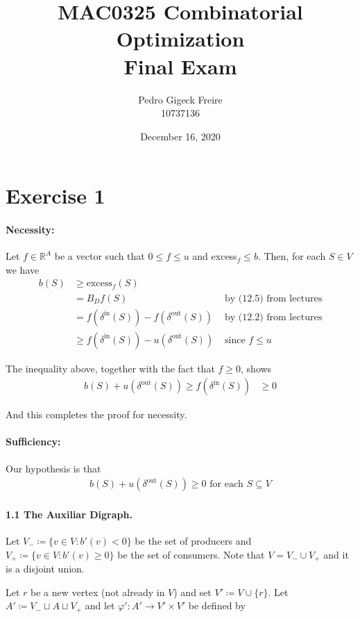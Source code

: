 \documentclass[a4paper,10pt, leqno]{article}
\title{MAC0325 Combinatorial Optimization \\
        \large Final Exam}
\author{Pedro Gigeck Freire \\
        10737136}
\date{December 16, 2020}
\theoremstyle{definition}
\begin{document}
\maketitle

\section*{Exercise 1}


\paragraph{Necessity:}

Let $f \in \mathbb{R}^A$ be a vector such that $0 \leq f \leq u$ and excess$_f \leq b$.
Then, for each $S \in V$ we have
\begin{align*}
 b(S) &\geq \text{excess}_f(S) \\
 &= B_Df(S) &\text{ by (12.5) from lectures} \\
 &= f(\delta^{\text{in}}(S)) - f(\delta^{\text{out}}(S)) &\text{ by (12.2) from lectures}\\
 &\geq f(\delta^{\text{in}}(S)) - u(\delta^{\text{out}}(S)) &\text{ since } f \leq u
\end{align*}

The inequality above, together with the fact that $f \geq 0$, shows
\begin{align*}
 b(S) + u(\delta^{\text{out}}(S)) \geq f(\delta^{\text{in}}(S)) &\geq 0
\end{align*}

And this completes the proof for necessity.

\paragraph{Sufficiency:} Our hypothesis is that 
\begin{align*}
 b(S) + u(\delta^{\text{out}}(S)) \geq 0 \text{ for each } S \subseteq V
\end{align*}

\paragraph{\textbf{1.1 The Auxiliar Digraph.}}
Let $V_- \coloneqq \{ v \in V : b'(v) < 0\}$ be the set of producers and $V_+ \coloneqq \{ v \in V : b'(v) \geq 0\}$ be the set of consumers. Note that $V = V_- \cup V_+$ and it is a disjoint union.

Let $r$ be a new vertex (not already in $V$) and set $V' \coloneqq V \cup \{ r \}$. Let $A' \coloneqq V_- \sqcup A \sqcup V_+$ and let $\varphi' : A' \to V' \times V'$ be defined by
\end{document}
